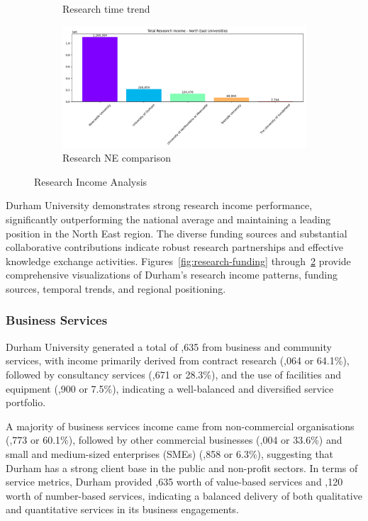 \documentclass[journal,onecolumn, 10pt,draftclsnofoot]{IEEEtran}
\begin{document}
\begin{figure}[h]
\begin{subfigure}[b]{0.48\textwidth}
    \caption{Research time trend}
    \label{fig:research-time-trend}
\end{subfigure}
\hfill
\begin{subfigure}[b]{0.48\textwidth}
    \centering
    \includegraphics[width=\textwidth]{Fig/figure6.research_ne_comparison.png}
    \caption{Research NE comparison}
    \label{fig:research-ne-comparison}
\end{subfigure}
\caption{Research Income Analysis}
\label{fig:research-income-analysis}
\end{figure}

Durham University demonstrates strong research income performance, significantly outperforming the national average and maintaining a leading position in the North East region. The diverse funding sources and substantial collaborative contributions indicate robust research partnerships and effective knowledge exchange activities. Figures~\ref{fig:research-funding} through~\ref{fig:research-ne-comparison} provide comprehensive visualizations of Durham's research income patterns, funding sources, temporal trends, and regional positioning.

\subsubsection{Business Services}

Durham University generated a total of ,635 from business and community services, with income primarily derived from contract research (,064 or 64.1\%), followed by consultancy services (,671 or 28.3\%), and the use of facilities and equipment (,900 or 7.5\%), indicating a well-balanced and diversified service portfolio.

A majority of business services income came from non-commercial organisations (,773 or 60.1\%), followed by other commercial businesses (,004 or 33.6\%) and small and medium-sized enterprises (SMEs) (,858 or 6.3\%), suggesting that Durham has a strong client base in the public and non-profit sectors. In terms of service metrics, Durham provided ,635 worth of value-based services and ,120 worth of number-based services, indicating a balanced delivery of both qualitative and quantitative services in its business engagements.
\end{document}
